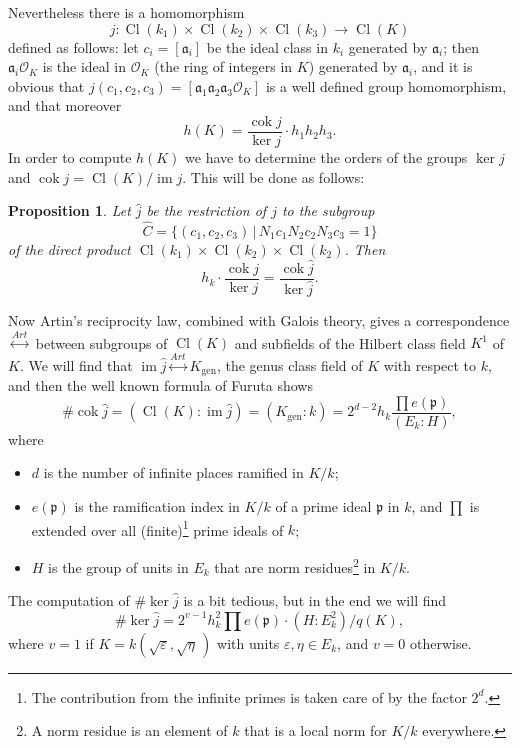 \documentclass{amsart}
\newcommand{\fa}{{\mathfrak a}}
\newcommand{\fp}{{\mathfrak p}}
\newcommand{\eps}{\varepsilon}
\newcommand{\OO}{{\mathcal O}}
\newcommand{\hj}{\widehat{j}}
\newcommand{\hC}{\widehat{C}}
\newcommand{\sth}{\,|\,}
\newcommand{\Cl}{\operatorname{Cl}}
\newcommand{\lra}{\longrightarrow}
\newcommand{\cok}{\operatorname{cok}}
\newcommand{\im}{\operatorname{im}}
\newcommand{\art}{\overset{Art}{\longleftrightarrow}}
\newcommand{\gen}{{\operatorname{gen}}}
\newcommand{\ts}{\textstyle}
\newtheorem{prop}{Proposition}
\begin{document}
Nevertheless there is a homomorphism
$$ j: \Cl(k_1) \times \Cl(k_2) \times \Cl(k_3) \lra \Cl(K) $$
defined as follows: let $c_i = [\fa_i]$ be the ideal class in
$k_i$ generated by $\fa_i$; then $\fa_i\OO_K$ is the ideal in
$\OO_K$ (the ring of integers in $K$) generated by $\fa_i$,
and it is obvious that $j(c_1,c_2,c_3) = [\fa_1\fa_2\fa_3\OO_K]$
is a well defined group homomorphism, and that moreover
$$ h(K) = \frac{\cok j}{\ker j} \cdot h_1h_2h_3. $$
In order to compute $h(K)$ we have to determine the orders of
the groups $\ker j$ and $\cok j = \Cl(K)/\im j$. This will be
done as follows:

\begin{prop}
Let $\hj$ be the restriction of $j$ to the subgroup
$$ \hC = \{(c_1, c_2, c_3) \sth N_1c_1 N_2c_2 N_3c_3 = 1\} $$
of the direct product $\Cl(k_1) \times \Cl(k_2) \times \Cl(k_2)$.
Then
\begin{equation}\label{E1.2}
 h_k \cdot \frac{\cok j}{\ker j}  = \frac{\cok \hj}{\ker \hj}.
\end{equation}
\end{prop}

Now Artin's reciprocity law, combined with Galois theory, gives
a correspondence $\art$ between subgroups of $\Cl(K)$ and subfields
of the Hilbert class field $K^1$ of $K$. We will find that
$\im \hj \art K_\gen$, the genus class field of $K$ with respect
to $k$, and then the well known formula of Furuta \cite{Fur} shows
\begin{equation}\label{E1.3}
  \# \cok \hj = (\Cl(K): \im \hj) = (K_\gen:k) =
   2^{d-2} h_k \frac{\prod e(\fp)}{(E_k:H)}, \end{equation}
where
\begin{itemize}
\item $d$ is the number of infinite places ramified in $K/k$;
\item $e(\fp)$ is the ramification index in $K/k$ of a prime
      ideal $\fp$ in $k$, and $\prod$ is extended over all
      (finite)\footnote{The contribution from the infinite primes
      is taken care of by the factor $2^d$.} prime ideals of $k$;
\item $H$ is the group of units in $E_k$ that are norm
      residues\footnote{A norm residue is an element of $k$ that
      is a local norm for $K/k$ everywhere.} in $K/k$.
\end{itemize}

The computation of $\# \ker \hj$ is a bit tedious, but in the end
we will find
\begin{equation}\label{E1.4}
\ts \# \ker \hj = 2^{v-1} h_k^2 \prod e(\fp) \cdot (H: E_k^2)/q(K),
\end{equation}
where $v = 1$ if $K = k(\sqrt{\eps},\sqrt{\eta}\,)$ with units
$\eps, \eta \in E_k$, and $v = 0$ otherwise.
\end{document}
